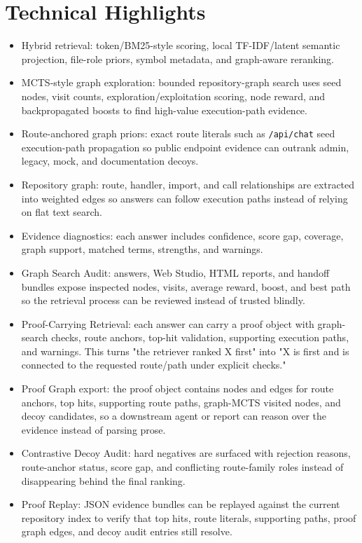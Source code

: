 \documentclass[UTF8,12pt,openany]{ctexbook}
\begin{document}
\section{Technical Highlights}

\begin{itemize}
\item Hybrid retrieval: token/BM25-style scoring, local TF-IDF/latent semantic projection, file-role priors, symbol metadata, and graph-aware reranking.
\item MCTS-style graph exploration: bounded repository-graph search uses seed nodes, visit counts, exploration/exploitation scoring, node reward, and backpropagated boosts to find high-value execution-path evidence.
\item Route-anchored graph priors: exact route literals such as \texttt{/api/chat} seed execution-path propagation so public endpoint evidence can outrank admin, legacy, mock, and documentation decoys.
\item Repository graph: route, handler, import, and call relationships are extracted into weighted edges so answers can follow execution paths instead of relying on flat text search.
\item Evidence diagnostics: each answer includes confidence, score gap, coverage, graph support, matched terms, strengths, and warnings.
\item Graph Search Audit: answers, Web Studio, HTML reports, and handoff bundles expose inspected nodes, visits, average reward, boost, and best path so the retrieval process can be reviewed instead of trusted blindly.
\item Proof-Carrying Retrieval: each answer can carry a proof object with graph-search checks, route anchors, top-hit validation, supporting execution paths, and warnings. This turns "the retriever ranked X first" into "X is first and is connected to the requested route/path under explicit checks."
\item Proof Graph export: the proof object contains nodes and edges for route anchors, top hits, supporting route paths, graph-MCTS visited nodes, and decoy candidates, so a downstream agent or report can reason over the evidence instead of parsing prose.
\item Contrastive Decoy Audit: hard negatives are surfaced with rejection reasons, route-anchor status, score gap, and conflicting route-family roles instead of disappearing behind the final ranking.
\item Proof Replay: JSON evidence bundles can be replayed against the current repository index to verify that top hits, route literals, supporting paths, proof graph edges, and decoy audit entries still resolve.

\end{itemize}
\end{document}
